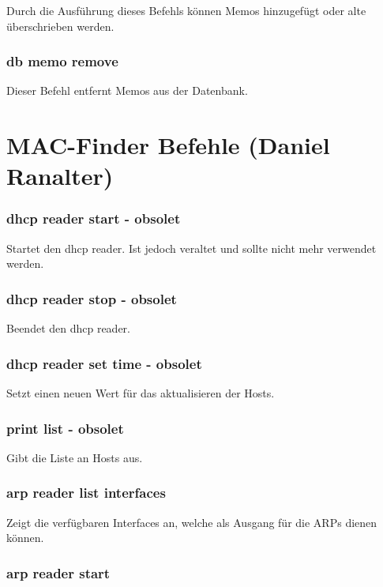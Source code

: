 \documentclass[12pt,a4paper]{report}
\begin{document}
\begin{onehalfspace}
Durch die Ausführung dieses Befehls können Memos hinzugefügt oder alte überschrieben werden.

\subsubsection{db memo remove}

Dieser Befehl entfernt Memos aus der Datenbank.

\newpage
\section{MAC-Finder Befehle (Daniel Ranalter)}

\subsubsection{dhcp reader start - obsolet}

Startet den dhcp reader. Ist jedoch veraltet und sollte nicht mehr verwendet werden.

\subsubsection{dhcp reader stop - obsolet}

Beendet den dhcp reader.

\subsubsection{dhcp reader set time - obsolet}

Setzt einen neuen Wert für das aktualisieren der Hosts.

\subsubsection{print list - obsolet}

Gibt die Liste an Hosts aus.

\subsubsection{arp reader list interfaces}

Zeigt die verfügbaren Interfaces an, welche als Ausgang für die ARPs dienen können.

\subsubsection{arp reader start}


\end{onehalfspace}
\end{document}
